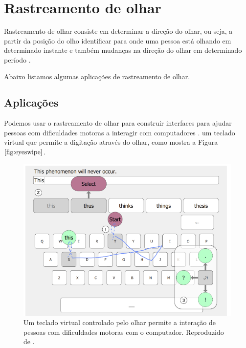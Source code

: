 \chapter{Rastreamento de olhar}


Rastreamento de olhar consiste em determinar a direção do olhar, ou seja, a partir da posição do olho identificar para onde uma pessoa está olhando em determinado instante e também mudanças na direção do olhar em determinado período \cite{lupung}.

Abaixo listamos algumas aplicações de rastreamento de olhar.

\section{Aplicações}

Podemos usar o rastreamento de olhar para construir interfaces para ajudar pessoas com dificuldades motoras a interagir com computadores \cite{lidade}.  um teclado virtual que permite a digitação através do olhar, como mostra a Figura $\ref{fig:eyeswipe}$.

\begin{figure}
\centering
\includegraphics[scale=.3]{imagens/teclado.png}
\caption{Um teclado virtual controlado pelo olhar permite a interação de pessoas com dificuldades motoras com o computador. Reproduzido de \cite{kurauchi2016eyeswipe}.}
\label{fig:eyeswipe}
\end{figure}

